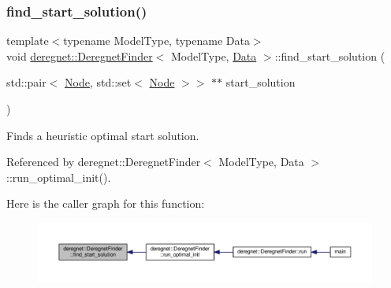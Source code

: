 \subsubsection{\texorpdfstring{find\+\_\+start\+\_\+solution()}{find\_start\_solution()}\hspace{0.1cm}{\footnotesize\ttfamily [1/3]}}
{\footnotesize\ttfamily template$<$typename Model\+Type, typename Data$>$ \\
void \hyperlink{classderegnet_1_1DeregnetFinder}{deregnet\+::\+Deregnet\+Finder}$<$ Model\+Type, \hyperlink{avgdrgnt_8cpp_a1d1235306db276e9b36acba1db1509e8}{Data} $>$\+::find\+\_\+start\+\_\+solution (\begin{DoxyParamCaption}\item[{std\+::pair$<$ \hyperlink{namespacederegnet_a744bad34f2de9856d36715a445f027f3}{Node}, std\+::set$<$ \hyperlink{namespacederegnet_a744bad34f2de9856d36715a445f027f3}{Node} $>$$>$ $\ast$$\ast$}]{start\+\_\+solution }\end{DoxyParamCaption})}



Finds a heuristic optimal start solution. 



Referenced by deregnet\+::\+Deregnet\+Finder$<$ Model\+Type, Data $>$\+::run\+\_\+optimal\+\_\+init().

Here is the caller graph for this function\+:\nopagebreak
\begin{figure}[H]
\begin{center}
\leavevmode
\includegraphics[width=350pt]{classderegnet_1_1DeregnetFinder_a9bca73c631c1ce679b07f1e0664abfa2_icgraph}
\end{center}
\end{figure}
\mbox{\label{classderegnet_1_1DeregnetFinder_a1b7a50c77d09000e2d80b39025d67393}} 
